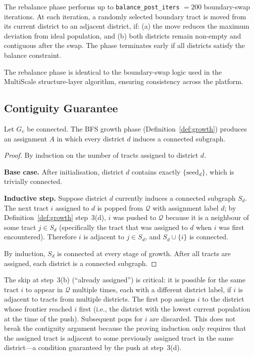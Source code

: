 \begin{definition}[Rebalance]
\label{def:rebalance}
The rebalance phase performs up to \texttt{balance\_post\_iters} $= 200$
boundary-swap iterations.
At each iteration, a randomly selected boundary tract is moved from its
current district to an adjacent district, if:
(a) the move reduces the maximum deviation from ideal population, and
(b) both districts remain non-empty and contiguous after the swap.
The phase terminates early if all districts satisfy the balance constraint.
\end{definition}

The rebalance phase is identical to the boundary-swap logic used in the
MultiScale structure-layer algorithm, ensuring consistency across the
platform.

\subsection{Contiguity Guarantee}

\begin{proposition}
\label{prop:contiguity}
Let $G_v$ be connected.
The BFS growth phase (Definition~\ref{def:growth}) produces an assignment
$A$ in which every district $d$ induces a connected subgraph.
\end{proposition}

\begin{proof}
By induction on the number of tracts assigned to district $d$.

\textbf{Base case.} After initialisation, district $d$ contains exactly
$\{\mathrm{seed}_d\}$, which is trivially connected.

\textbf{Inductive step.} Suppose district $d$ currently induces a connected
subgraph $S_d$.
The next tract $i$ assigned to $d$ is popped from $\mathcal{Q}$ with
assignment label $d$; by Definition~\ref{def:growth} step~3(d),
$i$ was pushed to $\mathcal{Q}$ because it is a neighbour of some tract
$j \in S_d$ (specifically the tract that was assigned to $d$ when $i$ was
first encountered).
Therefore $i$ is adjacent to $j \in S_d$, and $S_d \cup \{i\}$ is
connected.

By induction, $S_d$ is connected at every stage of growth.
After all tracts are assigned, each district is a connected subgraph.
\end{proof}

\begin{remark}
The skip at step~3(b) (``already assigned'') is critical: it is possible
for the same tract $i$ to appear in $\mathcal{Q}$ multiple times, each
with a different district label, if $i$ is adjacent to tracts from
multiple districts.
The first pop assigns $i$ to the district whose frontier reached $i$
first (i.e., the district with the lowest current population at the time
of the push).
Subsequent pops for $i$ are discarded.
This does not break the contiguity argument because the proving induction
only requires that the assigned tract is adjacent to some previously
assigned tract in the same district---a condition guaranteed by the push
at step~3(d).
\end{remark}

